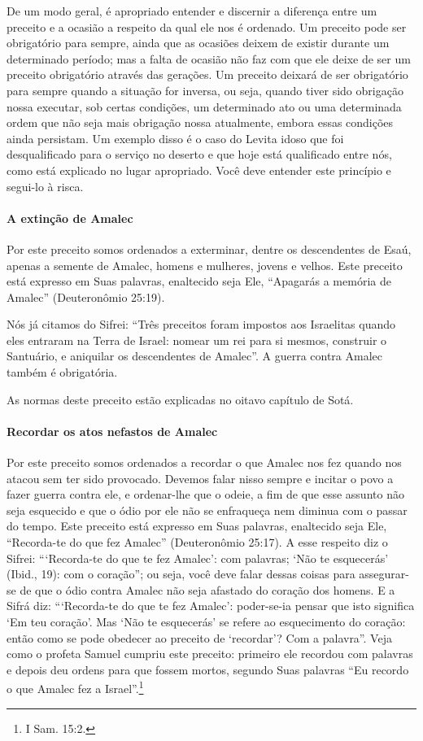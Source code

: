 De um modo geral, é apropriado entender e discernir a diferença
entre um preceito e a ocasião a respeito da qual ele nos é ordenado. Um
preceito pode ser obrigatório para sempre, ainda que as ocasiões deixem de
existir durante um determinado período; mas a falta de ocasião não faz
com que ele deixe de ser um preceito obrigatório através das gerações.
Um preceito deixará de ser obrigatório para sempre quando a situação for
inversa, ou seja, quando tiver sido obrigação nossa executar, sob certas
condições, um determinado ato ou uma determinada ordem que não seja mais
obrigação nossa atualmente, embora essas condições ainda persistam. Um
exemplo disso é o caso do Levita idoso que foi desqualificado para o
serviço no deserto e que hoje está qualificado entre nós, como está
explicado no lugar apropriado. Você deve entender este princípio e
segui-lo à risca.

\paragraph{A extinção de Amalec}

Por este preceito somos ordenados a exterminar, dentre os descendentes
de Esaú, apenas a semente de Amalec, homens e mulheres, jovens e
velhos. Este preceito está expresso em Suas palavras, enaltecido seja
Ele, ``Apagarás a memória de Amalec'' (Deuteronômio 25:19).

Nós já citamos do Sifrei: ``Três preceitos foram impostos aos
Israelitas quando eles entraram na Terra de Israel: nomear um rei para
si mesmos, construir o Santuário, e aniquilar os descendentes de
Amalec''. A guerra contra Amalec também é obrigatória.

As normas deste preceito estão explicadas no oitavo capítulo de Sotá.

\paragraph{Recordar os atos nefastos de Amalec}

Por este preceito somos ordenados a recordar o que Amalec nos fez quando
nos atacou sem ter sido provocado. Devemos falar nisso sempre e incitar
o povo a fazer guerra contra ele, e ordenar-lhe que o odeie, a fim de
que esse assunto não seja esquecido e que o ódio por ele não se
enfraqueça nem diminua com o passar do tempo. Este preceito está
expresso em Suas palavras, enaltecido seja Ele, ``Recorda-te do que fez
Amalec'' (Deuteronômio 25:17). A esse respeito diz o Sifrei:
```Recorda-te do que te fez Amalec': com palavras; `Não te esquecerás'
(Ibid., 19): com o coração''; ou seja, você deve falar dessas coisas
para assegurar-se de que o ódio contra Amalec não seja afastado do
coração dos homens. E a Sifrá diz: ```Recorda-te do que te fez Amalec':
poder-se-ia pensar que isto significa `Em teu coração'. Mas `Não te
esquecerás' se refere
ao esquecimento do coração: então como se pode obedecer ao preceito de
`recordar'? Com a palavra''. Veja como o profeta Samuel cumpriu este
preceito:
primeiro ele recordou com palavras e depois deu ordens para que fossem
mortos, segundo Suas palavras ``Eu recordo o que Amalec fez a
Israel''.\footnote{I Sam. 15:2.}

